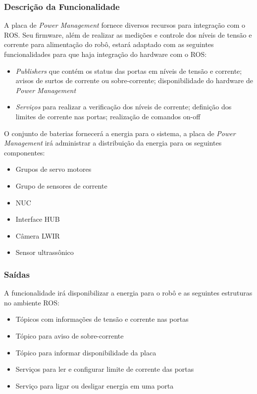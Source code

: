 \subsubsection{Descrição da Funcionalidade}
A placa de \textit{Power Management} fornece diversos recursos para integração com o ROS. Seu firmware, além de realizar as medições e controle dos níveis de tensão e corrente para alimentação do robô, estará adaptado com as seguintes funcionalidades para que haja integração do hardware com o ROS:
\begin{itemize}
	\item \textit{Publishers} que contém os status das portas em níveis de tensão e corrente; avisos de surtos de corrente ou sobre-corrente; disponibilidade do hardware de \textit{Power Management}
	\item \textit{Serviços} para realizar a verificação dos níveis de corrente; definição dos limites de corrente nas portas; realização de comandos on-off
\end{itemize}
O conjunto de baterias fornecerá a energia para o sistema, a placa de \textit{Power Management} irá administrar a distribuição da energia para os seguintes componentes:
\begin{itemize}
	\item Grupos de servo motores
	\item Grupo de sensores de corrente
	\item NUC
	\item Interface HUB
	\item Câmera LWIR
	\item Sensor ultrassônico
\end{itemize}

\subsubsection{Saídas}
A funcionalidade irá disponibilizar a energia para o robô e as seguintes estruturas no ambiente ROS:
\begin{itemize}
	\item Tópicos com informações de tensão e corrente nas portas
	\item Tópico para aviso de sobre-corrente
	\item Tópico para informar disponibilidade da placa
	\item Serviços para ler e configurar limite de corrente das portas
	\item Serviço para ligar ou desligar energia em uma porta	
\end{itemize}

